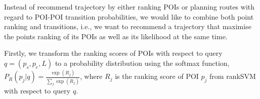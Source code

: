 
Instead of recommend trajectory by either ranking POIs or planning routes with regard to POI-POI transition probabilities, 
we would like to combine both point ranking and transitions,
i.e., we want to recommend a trajectory that maximise the points ranking of its POIs as well as its likelihood at the same time.

Firstly, we transform the ranking scores of POIs with respect to query $q = (p_s, p_e, L)$
to a probability distribution using the softmax function,
$P_R(p_j | q) = \frac{\exp(R_j)}{\sum_j \exp(R_j)}$,
where $R_j$ is the ranking score of POI $p_j$ from rankSVM with respect to query $q$.


